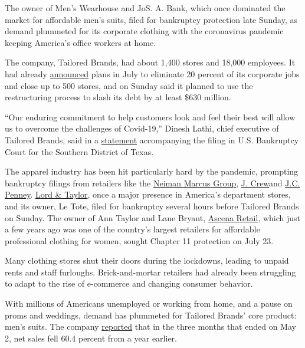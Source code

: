 The owner of Men's Wearhouse and JoS. A. Bank, which once dominated the
market for affordable men's suits, filed for bankruptcy protection late
Sunday, as demand plummeted for its corporate clothing with the
coronavirus pandemic keeping America's office workers at home.

The company, Tailored Brands, had about 1,400 stores and 18,000
employees. It had already
\href{https://www.businesswire.com/news/home/20200721005319/en/Tailored-Brands-Announces-Plans-Reduce-Headcount-Close}{announced}
plans in July to eliminate 20 percent of its corporate jobs and close up
to 500 stores, and on Sunday said it planned to use the restructuring
process to slash its debt by at least \$630 million.

``Our enduring commitment to help customers look and feel their best
will allow us to overcome the challenges of Covid-19,'' Dinesh Lathi,
chief executive of Tailored Brands, said in a
\href{https://www.tailoredstronger.com/wp-content/uploads/2020/08/TLRD-Infographic_08022020.pdf}{statement}
accompanying the filing in U.S. Bankruptcy Court for the Southern
District of Texas.

The apparel industry has been hit particularly hard by the pandemic,
prompting bankruptcy filings from retailers like the
\href{https://www.nytimes.com/2020/05/07/business/neiman-marcus-bankruptcy.html}{Neiman
Marcus Group},
\href{https://www.nytimes.com/2020/05/03/business/j-crew-bankruptcy-coronavirus.html}{J.
Crew}and
\href{https://www.nytimes.com/2020/05/15/business/jc-penney-bankruptcy-coronavirus.html}{J.C.
Penney}.
\href{https://www.nytimes.com/2020/08/02/business/Lord-and-Taylor-Bankruptcy.html}{Lord
\& Taylor}, once a major presence in America's department stores, and
its owner, Le Tote, filed for bankruptcy several hours before Tailored
Brands on Sunday. The owner of Ann Taylor and Lane Bryant,
\href{https://www.nytimes.com/2020/07/23/business/ascena-bankruptcy-ann-taylor-lane-bryant.html}{Ascena
Retail}, which just a few years ago was one of the country's largest
retailers for affordable professional clothing for women, sought Chapter
11 protection on July 23.

Many clothing stores shut their doors during the lockdowns, leading to
unpaid rents and staff furloughs. Brick-and-mortar retailers had already
been struggling to adapt to the rise of e-commerce and changing consumer
behavior.

With millions of Americans unemployed or working from home, and a pause
on proms and weddings, demand has plummeted for Tailored Brands' core
product: men's suits. The company
\href{https://ir.tailoredbrands.com/press-releases/detail/1893/tailored-brands-inc-provides-business-update-reports}{reported}
that in the three months that ended on May 2, net sales fell 60.4
percent from a year earlier.

